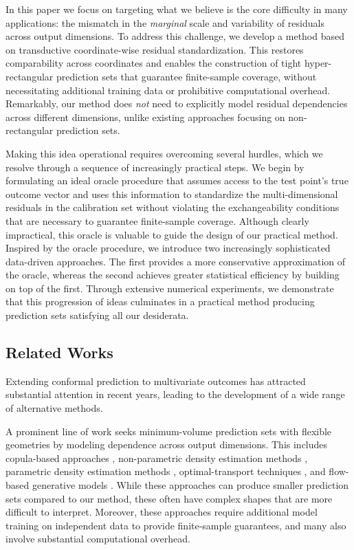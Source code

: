 In this paper we focus on targeting what we believe is the core difficulty in many applications: the mismatch in the {\em marginal} scale and variability of residuals across output dimensions. 
To address this challenge, we develop a method based on transductive coordinate-wise residual standardization. This restores comparability across coordinates and enables the construction of tight hyper-rectangular prediction sets that guarantee finite-sample coverage, without necessitating additional training data or prohibitive computational overhead. Remarkably, our method does {\em not} need to explicitly model residual dependencies across different dimensions, unlike existing approaches focusing on non-rectangular prediction sets.

Making this idea operational requires overcoming several hurdles, which we resolve through a sequence of increasingly practical steps. We begin by formulating an ideal oracle procedure that assumes access to the test point’s true outcome vector and uses this information to standardize the multi-dimensional residuals in the calibration set without violating the exchangeability conditions that are necessary to guarantee finite-sample coverage. Although clearly impractical, this oracle is valuable to guide the design of our practical method.
Inspired by the oracle procedure, we introduce two increasingly sophisticated data-driven approaches. The first provides a more conservative approximation of the oracle, whereas the second achieves greater statistical efficiency by building on top of the first. Through extensive numerical experiments, we demonstrate that this progression of ideas culminates in a practical method producing prediction sets satisfying all our desiderata.


\subsection{Related Works}

Extending conformal prediction to multivariate outcomes has attracted substantial attention in recent years, leading to the development of a wide range of alternative methods.

A prominent line of work seeks minimum-volume prediction sets with flexible geometries by modeling dependence across output dimensions.
This includes copula-based approaches \citep{messoudi2021copula, pmlr-v258-park25c, sun2024copula}, non-parametric density estimation methods \citep{sadinle2016least,izbicki2022cdsplit,wang2023pcp, dheur2025unified}, parametric density estimation methods \citep{johnstone2021conformal,sampson2024conformal,braun2025minimum,braun2025multivariate},  optimal-transport techniques \citep{thurin2025otcp, klein2025multivariate}, and flow-based generative models \citep{colombo2024normalizing, lee2025flow, fang2025contra}. While these approaches can produce smaller prediction sets compared to our method, these often have complex shapes that are more difficult to interpret. Moreover, these approaches require additional model training on independent data to provide finite-sample guarantees, and many also involve substantial computational overhead.

